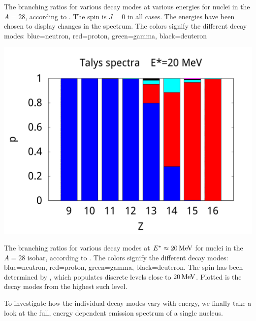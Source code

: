 {\begin{figurehere}
\begin{center}
\caption{\label{fig:bars3} The branching ratios for various decay modes at various energies for nuclei in the $A=28$, according to \codename{}. The spin is $J=0$ in all cases. The energies have been chosen to display changes in the spectrum. The colors signify the different decay modes: blue=neutron, red=proton, green=gamma, black=deuteron}
\end{center}
\end{figurehere}
\vspace{-5ex}
\begin{figurehere}
\begin{center}
\includegraphics[width=\bredd\textwidth]{figures/bars/20-t-spectra.pdf}
\caption{\label{fig:barst} The branching ratios for various decay modes at $E^*\approx\unit[20]{MeV}$ for nuclei in the $A=28$ isobar, according to . The colors signify the different decay modes: blue=neutron, red=proton, green=gamma, black=deuteron. The spin has been determined by , which populates discrete levels close to $\unit[20]{MeV}$. Plotted is the decay modes from the highest such level.}
\end{center}
\end{figurehere}
}
\clearpage
To investigate how the individual decay modes vary with energy, we finally take a look at the full, energy dependent emission spectrum of a single nucleus.
